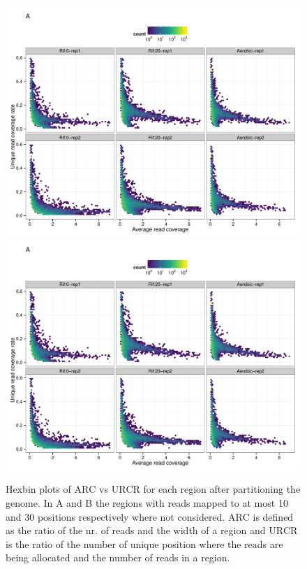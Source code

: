 \documentclass{bmcart}\usepackage[]{graphicx}\usepackage[]{color}
\begin{document}
\begin{figure}[h!]
  \centering
  \includegraphics[width = .8\textwidth,page = 3]{../figs/for_paper/Sig70_enrichment.pdf}
  \includegraphics[width = .8\textwidth,page = 4]{../figs/for_paper/Sig70_enrichment.pdf}
  \caption{Hexbin plots of $\mbox{ARC}$ vs $\mbox{URCR}$ for each
    region after partitioning the genome. In A and B the regions with
    reads mapped to at most 10 and 30 positions respectively where not
    considered. $\mbox{ARC}$ is defined as the ratio of the nr. of
    reads and the width of a region and $\mbox{URCR}$ is the ratio of
    the number of unique position where the reads are being allocated
    and the number of reads in a region.}
  \label{fig:enrich2}
\end{figure}
\end{document}
